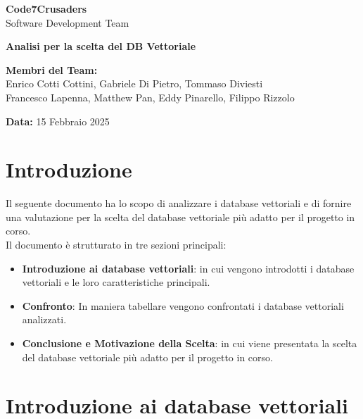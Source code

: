 \documentclass{article}
\begin{document}
\begin{titlepage}
    {\Huge \textbf{Code7Crusaders}}\\
    \vspace{0.5cm}
    {\Large Software Development Team}\\
    \vspace{2cm}
    
    {\large \textbf{Analisi per la scelta del DB Vettoriale}}\\
    \vspace{5cm}

    \textbf{Membri del Team:}\\
    Enrico Cotti Cottini, Gabriele Di Pietro, Tommaso Diviesti \\
    Francesco Lapenna, Matthew Pan, Eddy Pinarello, Filippo Rizzolo \\
    \vspace{0.5cm}
    
    {\large \textbf{Data:}} 15 Febbraio 2025\\
    
    \vspace{1cm}
\end{titlepage}
\clearpage

\newpage
\tableofcontents

\listoftables
\newpage


\section{Introduzione}
Il seguente documento ha lo scopo di analizzare i database vettoriali e di fornire una valutazione per la scelta del database vettoriale più adatto per il progetto in corso.\\
Il documento è strutturato in tre sezioni principali:

\begin{itemize}
    \item \textbf{Introduzione ai database vettoriali}: in cui vengono introdotti i database vettoriali e le loro caratteristiche principali.
    \item \textbf{Confronto}: In maniera tabellare vengono confrontati i database vettoriali analizzati.
    \item \textbf{Conclusione e Motivazione della Scelta}: in cui viene presentata la scelta del database vettoriale più adatto per il progetto in corso.
\end{itemize}

\section{Introduzione ai database vettoriali}
\end{document}
